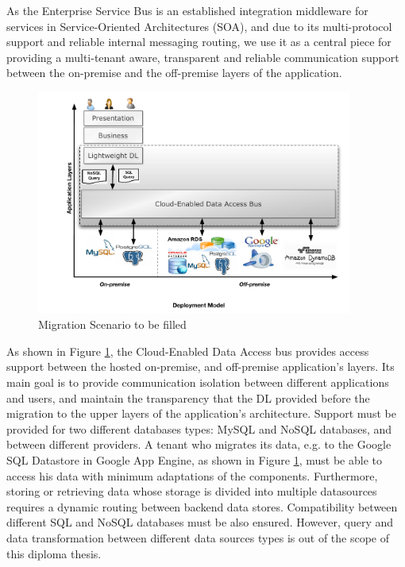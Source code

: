 As the Enterprise Service Bus is an established integration middleware for services in Service-Oriented Architectures (SOA), and due to its multi-protocol support and reliable internal messaging routing, we use it as a central piece for providing a multi-tenant aware, transparent and reliable communication support between the on-premise and the off-premise layers of the application.


\begin{figure}[htb]
	\centering
		\includegraphics[width=0.925\textwidth, trim=0.0cm 0.0cm 0.0cm 0.0cm, clip]{./gfx/motivationScenario.pdf}
	\caption[Migration Scenario]{Migration Scenario to be filled }
	\label{fig:motivationscenario}
\end{figure}

As shown in Figure \ref{fig:motivationscenario}, the Cloud-Enabled Data Access bus provides access support between the hosted on-premise, and off-premise application's layers. Its main goal is to provide communication isolation between different applications and users, and maintain the transparency that the DL provided before the migration to the upper layers of the application's architecture. Support must be provided for two different databases types: MySQL and NoSQL databases, and between different providers. A tenant who migrates its data, e.g. to the Google SQL Datastore in Google App Engine, as shown in Figure \ref{fig:motivationscenario}, must be able to access his data with minimum adaptations of the components. Furthermore, storing or retrieving data whose storage is divided into multiple datasources requires a dynamic routing between backend data stores. Compatibility between different SQL and NoSQL databases must be also ensured. However, query and data transformation between different data sources types is out of the scope of this diploma thesis.  


\FloatBarrier
